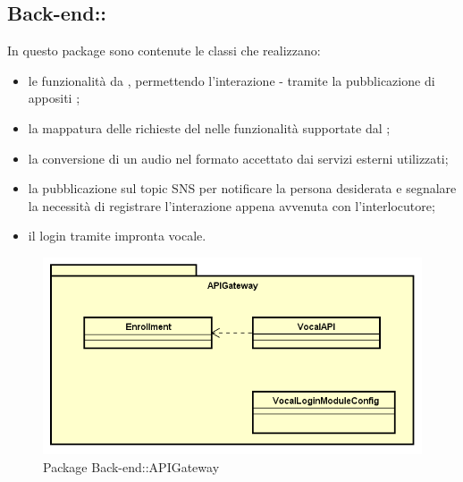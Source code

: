 \subsection{Back-end::}
In questo package sono contenute le classi che realizzano:
\begin{itemize}
	\item le funzionalità da , permettendo l'interazione  -  tramite la pubblicazione di appositi ;
	\item la mappatura delle richieste del  nelle funzionalità supportate dal ;
	\item la conversione di un audio nel formato accettato dai servizi esterni utilizzati;
	\item la pubblicazione sul topic SNS per notificare la persona desiderata e segnalare la necessità di registrare l'interazione appena avvenuta con l'interlocutore;
	\item il login tramite impronta vocale.
\end{itemize}
\begin{figure}[h] \centering \includegraphics[width=\textwidth,height=\textheight,keepaspectratio]{images/diagrams/back-end/Official_Backend_0304/APIGateway.png}
	\caption{Package Back-end::APIGateway}
\end{figure}
\newpage



